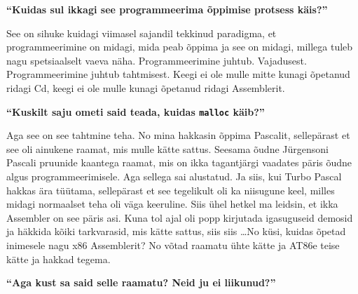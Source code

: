\textbf{\enquote{Kuidas sul ikkagi see programmeerima õppimise protsess käis?}}

See on sihuke  kuidagi viimasel sajandil tekkinud paradigma, et programmeerimine on midagi, mida peab õppima ja see on midagi, millega tuleb nagu spetsiaalselt vaeva näha. Programmeerimine juhtub. Vajadusest. Programmeerimine juhtub tahtmisest. Keegi ei ole mulle mitte kunagi õpetanud ridagi Cd, keegi ei ole mulle kunagi õpetanud ridagi Assemblerit. 

\textbf{\enquote{Kuskilt saju ometi said teada, kuidas \texttt{malloc} käib?}}

Aga see on see tahtmine teha. No mina hakkasin õppima Pascalit, sellepärast et see oli ainukene raamat, mis mulle kätte sattus. Seesama õudne Jürgensoni Pascali pruunide kaantega raamat, mis on ikka tagantjärgi vaadates päris õudne algus programmeerimisele. Aga sellega sai alustatud. Ja siis, kui Turbo Pascal hakkas ära tüütama, sellepärast et see tegelikult oli ka niisugune keel, milles midagi normaalset teha oli väga keeruline. Siis ühel hetkel ma leidsin, et ikka Assembler on see päris asi. Kuna tol ajal oli popp kirjutada igasuguseid demosid ja häkkida kõiki tarkvarasid, mis kätte sattus, siis siis \ldots No küsi, kuidas õpetad inimesele nagu x86 Assemblerit? No võtad raamatu ühte kätte ja AT86e teise kätte ja hakkad tegema.

\textbf{\enquote{Aga kust sa said selle raamatu? Neid ju ei liikunud?}}

